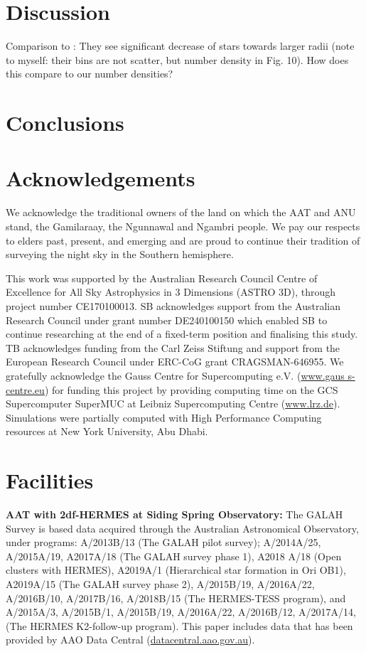 \documentclass[fleqn,usenatbib]{mnras}
\begin{document}
\section{Discussion} \label{sec:discussion}

Comparison to \citet[][see their Fig. 10]{Minchev2014b}: They see significant decrease of stars towards larger radii (note to myself: their bins are not scatter, but number density in Fig. 10). How does this compare to our number densities?


\section{Conclusions}
\label{sec:conc}


\section*{Acknowledgements}

We acknowledge the traditional owners of the land on which the AAT and ANU stand, the Gamilaraay, the Ngunnawal and Ngambri people. We pay our respects to elders past, present, and emerging and are proud to continue their tradition of surveying the night sky in the Southern hemisphere.

This work was supported by the Australian Research Council Centre of Excellence for All Sky Astrophysics in 3 Dimensions (ASTRO 3D), through project number CE170100013. SB acknowledges support from the Australian Research Council under grant number DE240100150 which enabled SB to continue researching at the end of a fixed-term position and finalising this study. TB acknowledges funding from the Carl Zeiss Stiftung and support from the European Research Council under ERC-CoG grant CRAGSMAN-646955. We gratefully acknowledge the Gauss Centre for Supercomputing e.V. (\url{www.gaus s-centre.eu}) for funding this project by providing computing time on the GCS Supercomputer SuperMUC at Leibniz Supercomputing Centre (\url{www.lrz.de}). Simulations were partially computed with High Performance Computing resources at New York University, Abu Dhabi.

\section*{Facilities}

\textbf{AAT with 2df-HERMES at Siding Spring Observatory:} The GALAH Survey is based data acquired through the Australian Astronomical Observatory, under programs: A/2013B/13 (The GALAH pilot survey); A/2014A/25, A/2015A/19, A2017A/18 (The GALAH survey phase 1), A2018 A/18 (Open clusters with HERMES), A2019A/1 (Hierarchical star formation in Ori OB1), A2019A/15 (The GALAH survey phase 2), A/2015B/19, A/2016A/22, A/2016B/10, A/2017B/16, A/2018B/15 (The HERMES-TESS program), and A/2015A/3, A/2015B/1, A/2015B/19, A/2016A/22, A/2016B/12, A/2017A/14, (The HERMES K2-follow-up program). This paper includes data that has been provided by AAO Data Central (\url{datacentral.aao.gov.au}).
\end{document}

